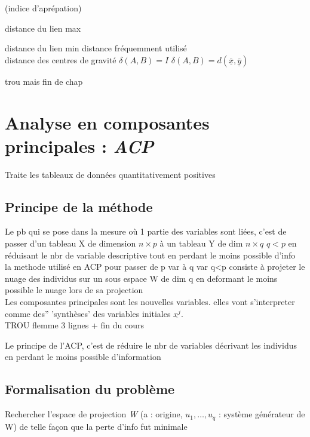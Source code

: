 \documentclass[a4paper]{report}
\begin{document}
(indice d'aprépation)

distance du lien max

distance du lien min \hspace{5cm} distance fréquemment utilisé\\
distance des centres de gravité \hspace{4cm} $\delta(A, B)=I$
$\delta(A, B)=d(\underline{\overline{x}}, \underline{\overline{y}})$

trou mais fin de chap

\chapter{Analyse en composantes principales : \emph{ACP}}

Traite les tableaux de données quantitativement positives

\section{Principe de la méthode}


Le pb qui se pose dans la mesure où 1 partie des variables sont liées, c'est de passer d'un tableau X de dimension $n \times p$ à un tableau Y de dim $n \times q$ $q < p$ en réduisant le nbr de variable descriptive tout en perdant le moins possible d'info\\
la methode utilisé en ACP pour passer de p var à q var q<p consiste à projeter le nuage des individus sur un sous espace W de dim q en deformant le moins possible le nuage lors de sa projection\\
Les composantes principales sont les nouvelles variables. elles vont s'interpreter comme des'' 'synthèses' des variables initiales $\underline{x^{j}}$.\\

\vspace{1cm}
TROU flemme 3 lignes + fin du cours
\vspace{1cm}

Le principe de l'ACP, c'est de réduire le nbr de variables décrivant les individus en perdant le moins possible d'information

\section{Formalisation du problème}


Rechercher l'espace de projection \emph{W} (a : origine, $u_{1},\hdots, u_{q}$ : système générateur de W)
de telle façon que la perte d'info fut minimale
\end{document}
